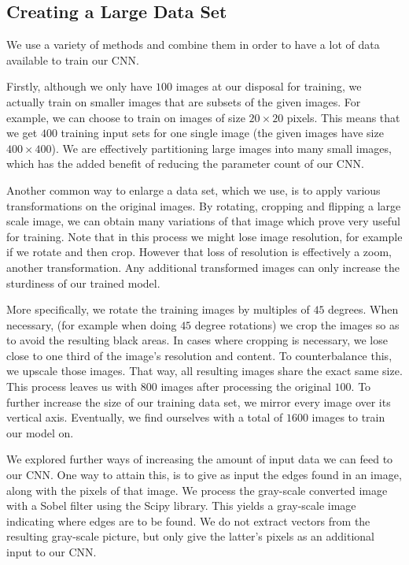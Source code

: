 \documentclass[10pt,conference,compsocconf]{IEEEtran}
\begin{document}
\subsection{Creating a Large Data Set} 
\label{ssec:data_proc}

We use a variety of methods and combine them in order to have a lot of data available to train our CNN. 

Firstly, although we only have $100$ images at our disposal for training, we actually train on smaller images that are subsets of the given images. For example, we can choose to train on images of size $20 \times 20$ pixels. This means that we get $400$ training input sets for one single image (the given images have size $400 \times 400$). We are effectively partitioning large images into many small images, which has the added benefit of reducing the parameter count of our CNN.

Another common way to enlarge a data set, which we use, is to apply various transformations on the original images. By rotating, cropping and flipping a large scale image, we can obtain many variations of that image which prove very useful for training. Note that in this process we might lose image resolution, for example if we rotate and then crop. However that loss of resolution is effectively a zoom, another transformation. Any additional transformed images can only increase the sturdiness of our trained model. 

More specifically, we rotate the training images by multiples of $45$ degrees. When necessary, (for example when doing $45$ degree rotations) we crop the images so as to avoid the resulting black areas. In cases where cropping is necessary, we lose close to one third of the image's resolution and content. To counterbalance this, we upscale those images. That way, all resulting images share the exact same size. This process leaves us with $800$ images after processing the original $100$. To further increase the size of our training data set, we mirror every image over its vertical axis. Eventually, we find ourselves with a total of $1600$ images to train our model on.

We explored further ways of increasing the amount of input data we can feed to our CNN. One way to attain this, is to give as input the edges found in an image, along with the pixels of that image. We process the gray-scale converted image with a Sobel filter using the Scipy library. This yields a gray-scale image indicating where edges are to be found. We do not extract vectors from the resulting gray-scale picture, but only give the latter's pixels as an additional input to our CNN.
\end{document}
